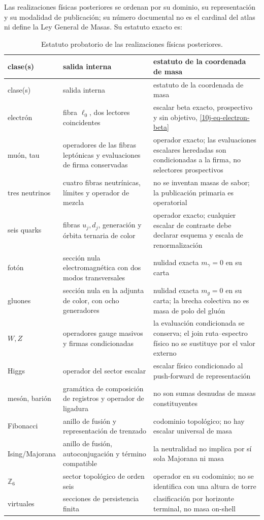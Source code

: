 Las realizaciones físicas posteriores se ordenan por su dominio, su
representación y su modalidad de publicación; su número documental no es el
cardinal del atlas ni define la Ley General de Masas. Su estatuto exacto es:
\begin{longtable}{@{}p{}p{}p{}@{}}
\caption{Estatuto probatorio de las realizaciones físicas posteriores.}
\label{10j-tab-realizaciones-fisicas}\\
\toprule
clase(s)&salida interna&estatuto de la coordenada de masa\\
\midrule
\endfirsthead
\toprule
clase(s)&salida interna&estatuto de la coordenada de masa\\
\midrule
\endhead
electrón&fibra \(\ell_0\), dos lectores coincidentes&escalar beta exacto,
prospectivo y sin objetivo, \eqref{10j-eq-electron-beta}\\
muón, tau&operadores de las fibras leptónicas y evaluaciones de firma
conservadas&operador exacto; las evaluaciones escalares heredadas son
condicionadas a la firma, no selectores prospectivos\\
tres neutrinos&cuatro fibras neutrínicas, límites y operador de mezcla&no se
inventan masas de sabor; la publicación primaria es operatorial\\
seis quarks&fibras \(u_j,d_j\), generación y órbita ternaria de color&operador
exacto; cualquier escalar de contraste debe declarar esquema y escala de
renormalización\\
fotón&sección nula electromagnética con dos modos transversales&nulidad exacta
\(m_\gamma=0\) en su carta\\
gluones&sección nula en la adjunta de color, con ocho generadores&nulidad exacta
\(m_g=0\) en su carta; la brecha colectiva no es masa de polo del gluón\\
\(W,Z\)&operadores gauge masivos y firmas condicionadas&la evaluación
condicionada se conserva; el join ruta--espectro físico no se sustituye por
el valor externo\\
Higgs&operador del sector escalar&escalar físico condicionado al push-forward
de representación\\
mesón, barión&gramática de composición de registros y operador de ligadura&no
son sumas desnudas de masas constituyentes\\
Fibonacci&anillo de fusión y representación de trenzado&codominio topológico;
no hay escalar universal de masa\\
Ising/Majorana&anillo de fusión, autoconjugación y término compatible&la
neutralidad no implica por sí sola Majorana ni masa\\
\(\mathbb Z_6\)&sector topológico de orden seis&operador en su codominio; no
se identifica con una altura de torre\\
virtuales&secciones de persistencia finita&clasificación por horizonte
terminal, no masa on-shell\\
\bottomrule
\end{longtable}

